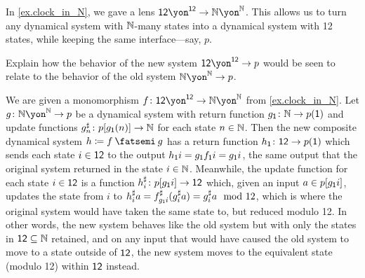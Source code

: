 \documentclass[Book-Poly]{subfiles}
\begin{document}
\begin{exercise}
In \cref{ex.clock_in_N}, we gave a lens $\1\2\yon^{\1\2}\to\nn\yon^\nn$. This allows us to turn any dynamical system with $\mathbb{N}$-many states into a dynamical system with 12 states, while keeping the same interface---say, $p$.

Explain how the behavior of the new system $\1\2\yon^{\1\2}\to p$ would be seen to relate to the behavior of the old system $\nn\yon^\nn\to p$.
\begin{solution}
We are given a monomorphism $f \colon \1\2\yon^{\1\2} \to \nn\yon^\nn$ from \cref{ex.clock_in_N}.
Let $g \colon \nn\yon^\nn \to p$ be a dynamical system with return function $g_{\textsf{1}} \colon \mathbb{N} \to p(\textsf{1})$ and update functions $g^\sharp_n \colon p[g_{\textsf{1}}(n)] \to \mathbb{N}$ for each state $n \in \mathbb{N}$.
Then the new composite dynamical system $h \coloneqq f \then g$ has a return function $h_{\textsf{1}} \colon \textsf{1}\textsf{2} \to p(\textsf{1})$ which sends each state $i \in \textsf{1}\textsf{2}$ to the output $h_{\textsf{1}}i = g_{\textsf{1}}f_{\textsf{1}}i = g_{\textsf{1}}i$, the same output that the original system returned in the state $i \in \mathbb{N}$.
Meanwhile, the update function for each state $i \in \textsf{1}\textsf{2}$ is a function $h^\sharp_i \colon p[g_{\textsf{1}}i] \to \textsf{1}\textsf{2}$ which, given an input $a \in p[g_{\textsf{1}}i]$, updates the state from $i$ to $h^\sharp_ia = f^\sharp_{g_{\textsf{1}}i}(g^\sharp_ia) = g^\sharp_ia \mod 12$, which is where the original system would have taken the same state to, but reduced modulo 12.
In other words, the new system behaves like the old system but with only the states in $\textsf{1}\textsf{2} \subseteq \mathbb{N}$ retained, and on any input that would have caused the old system to move to a state outside of $\textsf{1}\textsf{2}$, the new system moves to the equivalent state (modulo 12) within $\textsf{1}\textsf{2}$ instead.
\end{solution}
\end{exercise}

\end{document}
